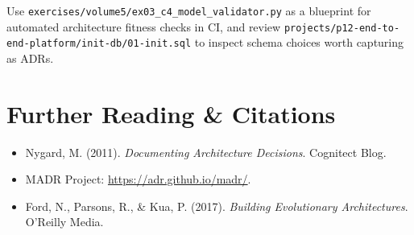 \begin{labbridgebox}
Use \texttt{exercises/volume5/ex03\_c4\_model\_validator.py} as a blueprint for automated architecture fitness checks in CI, and review \texttt{projects/p12-end-to-end-platform/init-db/01-init.sql} to inspect schema choices worth capturing as ADRs.
\end{labbridgebox}

\section{Further Reading \protect\& Citations}
\begin{itemize}[leftmargin=18pt]
  \item Nygard, M. (2011). \textit{Documenting Architecture Decisions}. Cognitect Blog.
  \item MADR Project: \url{https://adr.github.io/madr/}.
  \item Ford, N., Parsons, R., \& Kua, P. (2017). \textit{Building Evolutionary Architectures}. O'Reilly Media.
\end{itemize}
